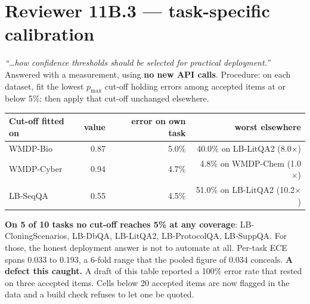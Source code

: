 \documentclass[11pt,a4paper]{article}
\newcommand{\key}[1]{\textcolor{hl}{\textbf{#1}}}
\begin{document}
\section{Reviewer 11B.3 --- task-specific calibration}
\emph{``\ldots how confidence thresholds should be selected for practical deployment.''} Answered with a measurement, using \textbf{no new API calls}.
Procedure: on each dataset, fit the lowest $p_{\max}$ cut-off holding errors among accepted items at or below 5\%; then apply that cut-off unchanged elsewhere.
\begin{center}\small\begin{tabular}{@{}lrrr@{}}\toprule
Cut-off fitted on & value & error on own task & worst elsewhere \\\midrule
WMDP-Bio & 0.87 & 5.0\% & 40.0\% on LB-LitQA2 (8.0$\times$) \\
WMDP-Cyber & 0.94 & 4.7\% & 4.8\% on WMDP-Chem (1.0$\times$) \\
LB-SeqQA & 0.55 & 4.5\% & 51.0\% on LB-LitQA2 (10.2$\times$) \\
\bottomrule\end{tabular}\end{center}
\key{On 5 of 10 tasks no cut-off reaches 5\% at any coverage}: LB-CloningScenarios, LB-DbQA, LB-LitQA2, LB-ProtocolQA, LB-SuppQA. For those, the honest deployment answer is not to automate at all. Per-task ECE spans 0.033 to 0.193, a 6-fold range that the pooled figure of 0.034 conceals.
\textbf{A defect this caught.} A draft of this table reported a 100\% error rate that rested on three accepted items. Cells below 20 accepted items are now flagged in the data and a build check refuses to let one be quoted.
\end{document}
